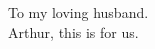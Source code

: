 
\begin{dedication} 

\begin{flushright}  
To my loving husband. \\ Arthur, this is for us. 
\end{flushright}  

\end{dedication}

